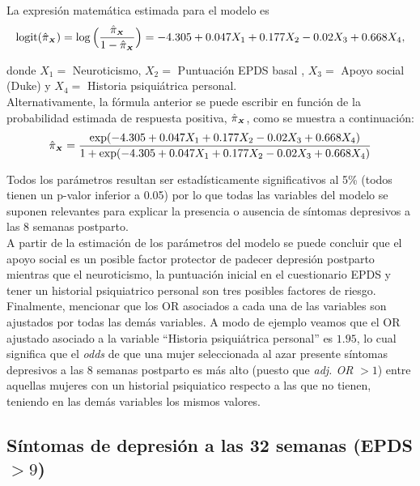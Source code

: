 La expresión matemática estimada para el modelo es
\begin{equation*}
\text{logit}(\hat{\pi}_{\mathsmaller{\boldsymbol{X}}})=\log\Big(\frac{\hat{\pi}_{\mathsmaller{\boldsymbol{X}}}}{1-\hat{\pi}_{\mathsmaller{\boldsymbol{X}}}}\Big)=-4.305+0.047X_1+0.177X_2-0.02X_3+0.668X_4,
\end{equation*}

donde $X_1=$ Neuroticismo, $X_2=$ Puntuación EPDS basal , $X_3=$ Apoyo social (Duke) y $X_4=$ Historia psiquiátrica personal.\\

Alternativamente, la fórmula anterior se puede escribir en función de la probabilidad estimada de respuesta positiva, $\hat{\pi}_{\mathsmaller{\boldsymbol{X}}}$, como se muestra a continuación:
\begin{equation*}
\hat{\pi}_{\mathsmaller{\boldsymbol{X}}}=\frac{\exp(-4.305+0.047X_1+0.177X_2-0.02X_3+0.668X_4)}{1+\exp(-4.305+0.047X_1+0.177X_2-0.02X_3+0.668X_4)}
\end{equation*}

Todos los parámetros resultan ser estadísticamente significativos al 5\% (todos tienen un p-valor inferior a 0.05) por lo que todas las variables del modelo se suponen relevantes para explicar la presencia o ausencia de síntomas depresivos a las 8 semanas postparto. \\

A partir de la estimación de los parámetros del modelo se puede concluir que el apoyo social es un posible factor protector de padecer depresión postparto mientras que el neuroticismo, la puntuación inicial en el cuestionario EPDS y tener un historial psiquiatrico personal son tres posibles factores de riesgo.\\

Finalmente, mencionar que los OR asociados a cada una de las variables son ajustados por todas las demás variables. A modo de ejemplo veamos que  el OR ajustado asociado a la variable ``Historia psiquiátrica personal'' es $1.95$, lo cual significa que el \textit{odds} de que una mujer seleccionada al azar presente síntomas depresivos a las 8 semanas postparto es más alto (puesto que \textit{adj. OR} $>1$) entre aquellas mujeres con un historial psiquiatico respecto a las que no tienen, teniendo en las demás variables los mismos valores.

\subsection{Síntomas de depresión a las 32 semanas (EPDS$>9$)}

